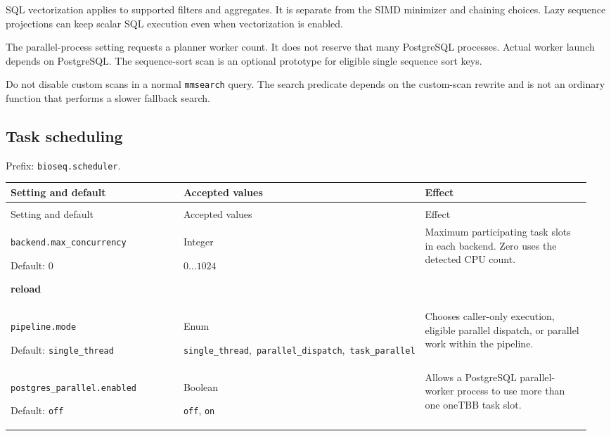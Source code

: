 SQL vectorization applies to supported filters and aggregates. It is separate
from the SIMD minimizer and chaining choices. Lazy sequence projections can
keep scalar SQL execution even when vectorization is enabled.

The parallel-process setting requests a planner worker count. It does not
reserve that many PostgreSQL processes. Actual worker launch depends on
PostgreSQL. The sequence-sort scan is an optional prototype for eligible single
sequence sort keys.

Do not disable custom scans in a normal \texttt{mmsearch} query. The search
predicate depends on the custom-scan rewrite and is not an ordinary function
that performs a slower fallback search.

\subsection{Task scheduling}

Prefix: \nolinkurl{bioseq.scheduler}.

\begingroup
\small
\setlength{\tabcolsep}{4pt}
\renewcommand{\arraystretch}{1.16}
\begin{longtable}{@{}>{\raggedright\arraybackslash}p{0.34\linewidth}>{\raggedright\arraybackslash}p{0.22\linewidth}>{\raggedright\arraybackslash}p{0.40\linewidth}@{}}
\toprule
Setting and default & Accepted values & Effect \\
\midrule
\endfirsthead
\multicolumn{3}{@{}l}{Prefix: \nolinkurl{bioseq.scheduler} (continued)} \\
\toprule
Setting and default & Accepted values & Effect \\
\midrule
\endhead
\bottomrule
\endfoot
\nolinkurl{backend.max_concurrency}\par Default: 0\par \textbf{reload} & Integer\par $0\ldots 1024$ & Maximum participating task slots in each backend. Zero uses the detected CPU count. \\[4pt]
\nolinkurl{pipeline.mode}\par Default: \nolinkurl{single_thread} & Enum\par \nolinkurl{single_thread},\allowbreak\ \nolinkurl{parallel_dispatch},\allowbreak\ \nolinkurl{task_parallel} & Chooses caller-only execution, eligible parallel dispatch, or parallel work within the pipeline. \\[4pt]
\nolinkurl{postgres_parallel.enabled}\par Default: \texttt{off} & Boolean\par \texttt{off}, \texttt{on} & Allows a PostgreSQL parallel-worker process to use more than one oneTBB task slot. \\[4pt]
\end{longtable}
\endgroup

